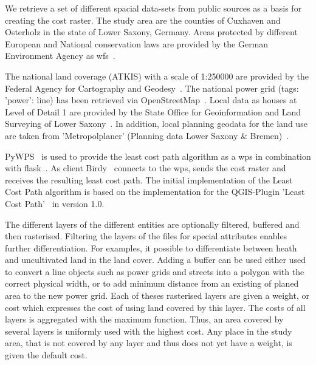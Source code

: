 
We retrieve a set of different spacial data-sets from  public sources as a basis for creating the cost raster.
The study area are the counties of Cuxhaven and Osterholz in the state of Lower Saxony, Germany.
Areas protected by different European and National conservation laws are provided by the German Environment Agency
as \acrfull{wfs}~\cite{noauthor_schutzgebiete_2015}.

The national land coverage (ATKIS) with a scale of 1:250000 are provided by the Federal Agency for Cartography
and Geodesy~\cite{noauthor_digitales_2021}.
The national power grid (tags: 'power': line) has been retrieved via OpenStreetMap~\cite{boeing_osmnx_2017}.
Local data as houses at Level of Detail 1 are provided by the State Office for Geoinformation and Land Surveying of
Lower Saxony~\cite{noauthor_opengeodatani_2022}.
In addition, local planning geodata for the land use are taken
from 'Metropolplaner' (Planning data Lower Saxony \& Bremen)~\cite{noauthor_metropolplaner_2022}.

PyWPS~\cite{noauthor_welcome_2016} is used to provide the least cost path algorithm as a \acrfull{wps} in combination with flask~\cite{noauthor_flask_nodate}.
As client Birdy~\cite{noauthor_birdy_nodate} connects to the \acrshort{wps}, sends the cost raster and receives the resulting least cost path.
The initial implementation of the Least Cost Path algorithm is based on the implementation for the QGIS-Plugin
'Least Cost Path'~\cite{noauthor_leastcostpathdijkstra_algorithmpy_2022} in version 1.0.


The different layers of the different entities are optionally filtered, buffered and then rasterised.
Filtering the layers of the files for special attributes enables further differentiation.
For examples, it possible to differentiate between heath and uncultivated land in the land cover.
Adding a buffer can be used either used to convert a line objects such as power grids and streets into a polygon with the
correct physical width, or to add minimum distance from an existing of planed area to the new power grid.
Each of theses rasterised layers are given a weight, or cost which expresses the cost of using land covered by this layer.
The costs of all layers is aggregated with the maximum function.
Thus, an area covered by several layers is uniformly used with the highest cost.
Any place in the study area, that is not covered by any layer and thus does not yet have a weight, is given the default cost.

